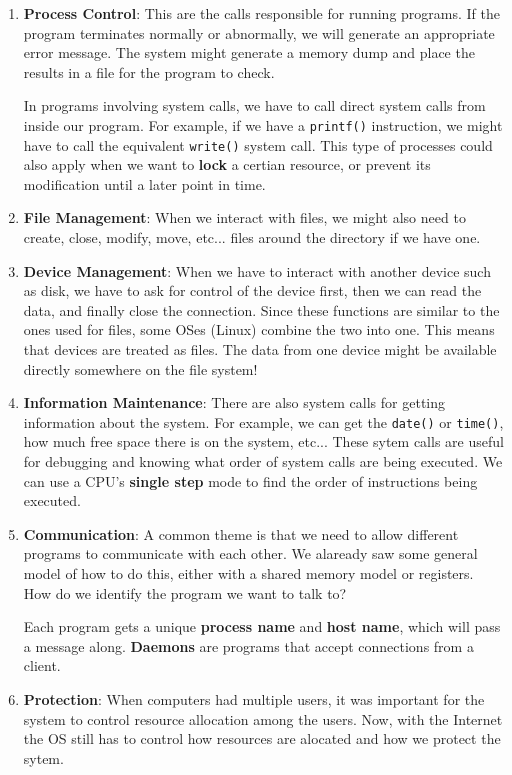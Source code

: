 \documentclass{tufte-handout}
\begin{document}
\begin{enumerate}
	\item \textbf{Process Control}: This are the calls responsible for running 
			programs. If the program terminates normally or abnormally, we will
			generate an appropriate error message. The system might generate a 
			memory dump and place the results in a file for the program to check.

			In programs involving system calls, we have to call direct system calls
			from inside our program. For example, if we have a \texttt{printf()} 
			instruction, we might have to call the equivalent \texttt{write()}
			system call. This type of processes could also apply when we want to 
			\textbf{lock} a certian resource, or prevent its modification until 
			a later point in time.

	\item \textbf{File Management}: When we interact with files, we might also need 
			to create, close, modify, move, etc... files around the directory 
			if we have one.
	\item \textbf{Device Management}: When we have to interact with another device
			such as disk, we have to ask for control of the device first, then
			we can read the data, and finally close the connection. Since these
			functions are similar to the ones used for files, some OSes (Linux) 
			combine the two into one. This means that devices are treated as files.
			The data from one device might be available directly somewhere on the 
			file system!
	\item \textbf{Information Maintenance}: There are also system calls for getting
			information about the system. For example, we can get the \texttt{date()}
			or \texttt{time()}, how much free space there is on the system, etc... 
			These sytem calls are useful for debugging and knowing what order of 
			system calls are being executed. We can use a CPU's \textbf{single step}
			mode to find the order of instructions being executed.
	\item \textbf{Communication}: A common theme is that we need to allow 
			different programs to communicate with each other. We alaready saw some
			general model of how to do this, either with a shared memory model or 
			registers. How do we identify the program we want to talk to?

			Each program gets a unique \textbf{process name} and 
			\textbf{host name}, which will pass a message along. \textbf{Daemons}
			are programs that accept connections from a client.

	\item \textbf{Protection}: When computers had multiple users, it was important
			for the system to control resource allocation among the users. Now, with 
			the Internet the OS still has to control how resources are alocated
			and how we protect the sytem.
\end{enumerate}
\end{document}

